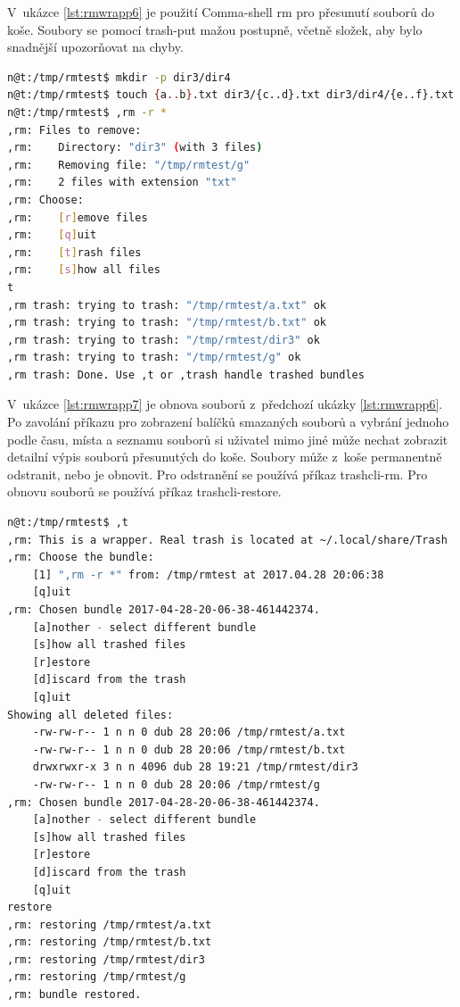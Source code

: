 \documentclass[thesis=M,czech]{FITthesis}[2012/06/26]
\begin{document}
V~ukázce \ref{lst:rmwrapp6} je použití Comma-shell rm pro přesunutí souborů do koše. Soubory se pomocí trash-put mažou postupně, včetně složek, aby bylo snadnější upozorňovat na chyby.


\begin{minipage}{\linewidth}
\begin{lstlisting}[language=bash, caption={,rm - přesouvání do koše}, label={lst:rmwrapp6}]
n@t:/tmp/rmtest$ mkdir -p dir3/dir4
n@t:/tmp/rmtest$ touch {a..b}.txt dir3/{c..d}.txt dir3/dir4/{e..f}.txt g
n@t:/tmp/rmtest$ ,rm -r *
,rm: Files to remove:
,rm:    Directory: "dir3" (with 3 files)
,rm:    Removing file: "/tmp/rmtest/g"
,rm:    2 files with extension "txt"
,rm: Choose:
,rm:    [r]emove files
,rm:    [q]uit
,rm:    [t]rash files
,rm:    [s]how all files
t
,rm trash: trying to trash: "/tmp/rmtest/a.txt" ok
,rm trash: trying to trash: "/tmp/rmtest/b.txt" ok
,rm trash: trying to trash: "/tmp/rmtest/dir3" ok
,rm trash: trying to trash: "/tmp/rmtest/g" ok
,rm trash: Done. Use ,t or ,trash handle trashed bundles
\end{lstlisting}
\end{minipage}

V~ukázce \ref{lst:rmwrapp7} je obnova souborů z~předchozí ukázky \ref{lst:rmwrapp6}. Po zavolání příkazu pro zobrazení balíčků smazaných souborů a vybrání jednoho podle času, místa a seznamu souborů si uživatel mimo jiné může nechat zobrazit detailní výpis souborů přesunutých do koše. Soubory může z~koše permanentně odstranit, nebo je obnovit. Pro odstranění se používá příkaz trashcli-rm. Pro obnovu souborů se používá příkaz trashcli-restore.

\begin{minipage}{\linewidth}
\begin{lstlisting}[language=bash, caption={,rm - obnova souborů }, label={lst:rmwrapp7}]
n@t:/tmp/rmtest$ ,t
,rm: This is a wrapper. Real trash is located at ~/.local/share/Trash
,rm: Choose the bundle:
    [1] ",rm -r *" from: /tmp/rmtest at 2017.04.28 20:06:38
    [q]uit
,rm: Chosen bundle 2017-04-28-20-06-38-461442374.
    [a]nother - select different bundle
    [s]how all trashed files
    [r]estore
    [d]iscard from the trash
    [q]uit
Showing all deleted files:
    -rw-rw-r-- 1 n n 0 dub 28 20:06 /tmp/rmtest/a.txt
    -rw-rw-r-- 1 n n 0 dub 28 20:06 /tmp/rmtest/b.txt
    drwxrwxr-x 3 n n 4096 dub 28 19:21 /tmp/rmtest/dir3
    -rw-rw-r-- 1 n n 0 dub 28 20:06 /tmp/rmtest/g
,rm: Chosen bundle 2017-04-28-20-06-38-461442374.
    [a]nother - select different bundle
    [s]how all trashed files
    [r]estore
    [d]iscard from the trash
    [q]uit
restore
,rm: restoring /tmp/rmtest/a.txt
,rm: restoring /tmp/rmtest/b.txt
,rm: restoring /tmp/rmtest/dir3
,rm: restoring /tmp/rmtest/g
,rm: bundle restored.
\end{lstlisting}
\end{minipage}
\end{document}
